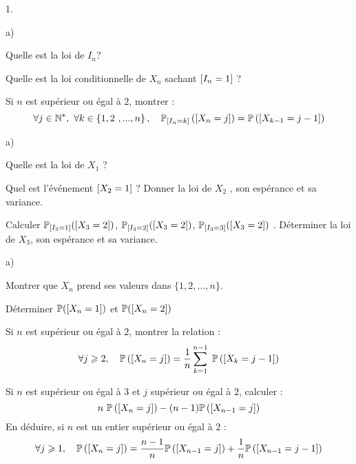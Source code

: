\documentclass[11pt]{article}%
\begin{document}
\begin{noliste}{1.}
\item

\begin{noliste}{a)}
\item Quelle est la loi de $I_{n}$?

\item Quelle est la loi conditionnelle de $X_{n}$ sachant 
$\left[ {I_{n}=1} \right]$ ?

\item Si $n$ est supérieur ou égal à $2$, montrer :%
\[
\forall j\in \mathbb{N}^*, \ \forall k\in \left\{ 1,2\ 
,...,n\right\}
,\quad \Prob_{\Ev{I_n=k}}\left( \Ev{X_{n}=j}\right) =\Prob\left( 
\Ev{X_{k-1}=j-1}\right)
\]
\end{noliste}

\item

\begin{noliste}{a)}
\item Quelle est la loi de $X_{1}$ ?

\item Quel est l'événement $\left[ {X_{2}=1} \right]$ ? Donner la loi de $X_{2}$ , 
son espérance et sa variance.

\item Calculer $\mathbb{P}_{\left[ {I_3=1} \right]}(\left[ {X_{3}=2} \right])$, 
$\mathbb{P}_{\left[ {I_3=2} \right]}(\left[ {X_{3}=2} \right])$, $%
\Prob_{\Ev{I_3=3}}(\Ev{X_{3}=2})$ . Déterminer la loi de 
$X_{3}$, son espérance et sa
variance.
\end{noliste}

\item 
\begin{noliste}{a)}
\item Montrer que $X_{n}$ prend ses valeurs dans ${\{}1,2,...,n{\}}$.

\item Déterminer $\mathbb{P}(\left[ {X_{n}=1} \right])$ et $\mathbb{P}(\left[ {X_{n}=2} \right])$

\item Si $n$ est supérieur ou égal à $2$, montrer la relation :%
\[
\forall j\geq 2,\quad \Prob\left(\Ev{X_{n}=j}\right) =\dfrac{1}{n}%
\DSum{k=1}{n-1} \Prob\left( \Ev{X_{k}=j-1}\right)
\]

\item Si $n$ est supérieur ou égal à $3$ et 
$j$
supérieur ou égal à $2$, calculer : 
\[
n \ \mathbb{P}\left( \left[ {X_{n}=j} \right]\right) 
-(n-1) \mathbb{P}\left(
\left[ {X_{n-1}=j} \right]\right)
\]
En déduire, si $n$ est un entier supérieur ou égal à $2$ :%
\[
\forall j\geqslant 1, \quad \mathbb{P}\left( \left[ {X_{n}=j} \right]\right) 
=\dfrac{n-1}{n} \mathbb{P}\left(
\left[ {X_{n-1}=j} \right]\right) +\dfrac{1}{n} \mathbb{P}\left(\left[ {X_{n-1}=j-1} \right]\right) 
\]
\end{noliste}


\end{noliste}
\end{document}
